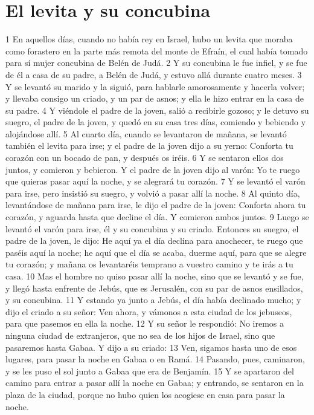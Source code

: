 \section*{El levita y su concubina}


1 En aquellos días, cuando no había rey en Israel, hubo un levita que moraba como forastero en la parte más remota del monte de Efraín, el cual había tomado para sí mujer concubina de Belén de Judá.
2 Y su concubina le fue infiel, y se fue de él a casa de su padre, a Belén de Judá, y estuvo allá durante cuatro meses. 
3 Y se levantó su marido y la siguió, para hablarle amorosamente y hacerla volver; y llevaba consigo un criado, y un par de asnos; y ella le hizo entrar en la casa de su padre.
4 Y viéndole el padre de la joven, salió a recibirle gozoso; y le detuvo su suegro, el padre de la joven, y quedó en su casa tres días, comiendo y bebiendo y alojándose allí.
5 Al cuarto día, cuando se levantaron de mañana, se levantó también el levita para irse; y el padre de la joven dijo a su yerno: Conforta tu corazón con un bocado de pan, y después os iréis.
6 Y se sentaron ellos dos juntos, y comieron y bebieron. Y el padre de la joven dijo al varón: Yo te ruego que quieras pasar aquí la noche, y se alegrará tu corazón.
7 Y se levantó el varón para irse, pero insistió su suegro, y volvió a pasar allí la noche.
8 Al quinto día, levantándose de mañana para irse, le dijo el padre de la joven: Conforta ahora tu corazón, y aguarda hasta que decline el día. Y comieron ambos juntos.
9 Luego se levantó el varón para irse, él y su concubina y su criado. Entonces su suegro, el padre de la joven, le dijo: He aquí ya el día declina para anochecer, te ruego que paséis aquí la noche; he aquí que el día se acaba, duerme aquí, para que se alegre tu corazón; y mañana os levantaréis temprano a vuestro camino y te irás a tu casa.
10 Mas el hombre no quiso pasar allí la noche, sino que se levantó y se fue, y llegó hasta enfrente de Jebús, que es Jerusalén, con su par de asnos ensillados, y su concubina.
11 Y estando ya junto a Jebús, el día había declinado mucho; y dijo el criado a su señor: Ven ahora, y vámonos a esta ciudad de los jebuseos, para que pasemos en ella la noche.
12 Y su señor le respondió: No iremos a ninguna ciudad de extranjeros, que no sea de los hijos de Israel, sino que pasaremos hasta Gabaa. Y dijo a su criado:
13 Ven, sigamos hasta uno de esos lugares, para pasar la noche en Gabaa o en Ramá.
14 Pasando, pues, caminaron, y se les puso el sol junto a Gabaa que era de Benjamín.
15 Y se apartaron del camino para entrar a pasar allí la noche en Gabaa; y entrando, se sentaron en la plaza de la ciudad, porque no hubo quien los acogiese en casa para pasar la noche.
